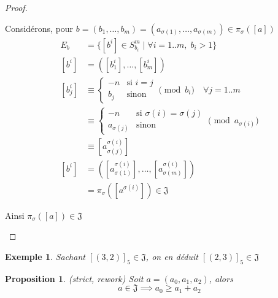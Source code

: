 \documentclass{article}
\newtheorem{proposition}{Proposition}
\newtheorem{exemple}{Exemple}
\begin{document}
\begin{proof}
\begin{enumerate}
        Considérons, pour $b = (b_1, \dots, b_m) = (a_{\sigma(1)}, \dots, a_{\sigma(m)}) \in \pi_{\sigma}([a])$
        \begin{align*}
            E_b & = \{ [b^i] \in S_{b_i}^m \mid \forall i = 1..m,\; b_i > 1 \} \\
            [b^i] & = ([b_1^i], \dots, [b_m^i]) \\
            [b_j^i] & \equiv \begin{cases}
                    -n &\text{si } i = j \\
                    b_j &\text{sinon}
                \end{cases} \pmod{b_i} \quad \forall j = 1..m \\
                & \equiv \begin{cases}
                    -n &\text{si } \sigma(i) = \sigma(j) \\
                    a_{\sigma(j)} &\text{sinon}
                \end{cases} \pmod {a_{\sigma(i)}} \\
                & \equiv [a_{\sigma(j)}^{\sigma(i)}] \\
            [b^i] & = ([a_{\sigma(1)}^{\sigma(i)}], \dots, [a_{\sigma(m)}^{\sigma(i)}]) \\
                & = \pi_{\sigma}([a^{\sigma(i)}]) \in \mathfrak{J}
        \end{align*}

        Ainsi $\pi_{\sigma}([a]) \in \mathfrak{J}$
    \end{enumerate}
\end{proof}

\begin{exemple}
    Sachant $[(3, 2)]_5 \in \mathfrak{J}$, on en déduit $[(2, 3)]_5 \in \mathfrak{J}$
\end{exemple}

\newpage

\begin{proposition}
    (strict, rework) Soit $a=(a_0, a_1, a_2)$, alors
    \[ a \in \mathfrak{J} \implies a_0 \geq a_1 + a_2 \]
\end{proposition}
\end{document}
